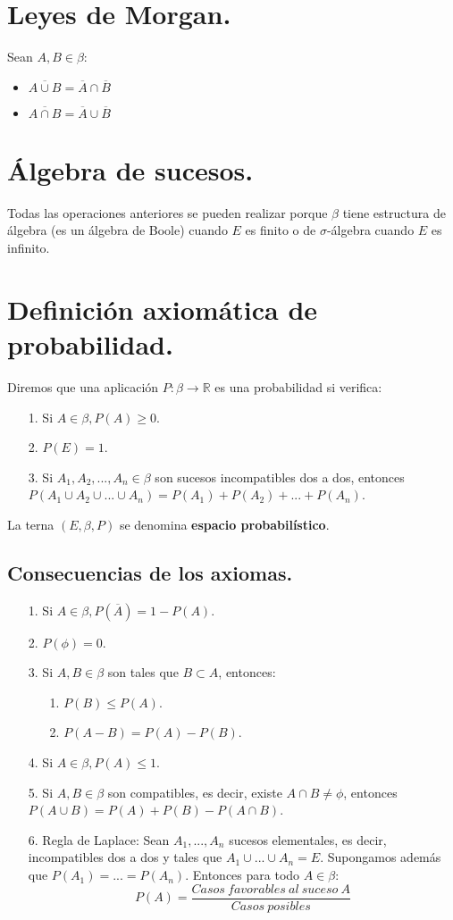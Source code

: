 \section{Leyes de Morgan.}
Sean $A, B \in \beta$:
\begin{itemize}
\item $\overline{A \cup B} = \overline{A} \cap \overline{B}$
\item $\overline{A \cap B} = \overline{A} \cup \overline{B}$
\end{itemize}


\section{Álgebra de sucesos.}
Todas las operaciones anteriores se pueden realizar porque $\beta$ tiene estructura de álgebra (es un álgebra de Boole) cuando $E$ es finito o de $\sigma$-álgebra cuando $E$ es infinito.


\section{Definición axiomática de probabilidad.}
Diremos que una aplicación $P: \beta \rightarrow \mathbb{R}$ es una probabilidad si verifica:
\begin{itemize}
\item[1.]Si $A \in \beta, P(A) \geq 0$.
\item[2.]$P(E) = 1$.
\item[3.]Si $A_{1},A_{2},...,A_{n} \in \beta$ son sucesos incompatibles dos a dos, entonces $P(A_{1} \cup A_{2} \cup ... \cup A_{n}) = P(A_{1}) + P(A_{2}) + ... + P(A_{n})$.
\end{itemize}
La terna $(E,\beta,P)$ se denomina \textbf{espacio probabilístico}.

\subsection{Consecuencias de los axiomas.}
\begin{itemize}
\item[1.]Si $A \in \beta, P(\overline{A}) = 1 - P(A)$.
\item[2.]$P(\phi)=0$.
\item[3.]Si $A,B \in \beta$ son tales que $B \subset A$, entonces:
\begin{itemize}
\item[1.]$P(B) \leq P(A)$.
\item[2.]$P(A-B)=P(A)-P(B)$.
\end{itemize}
\item[4.]Si $A \in \beta, P(A)\leq1$.
\item[5.]Si $A, B \in \beta$ son compatibles, es decir, existe $A \cap B \neq \phi$, entonces $P(A \cup B)=P(A)+P(B)-P(A \cap B)$.
\item[6.]Regla de Laplace: Sean $A_{1},...,A_{n}$ sucesos elementales, es decir, incompatibles dos a dos y tales que $A_{1} \cup ... \cup A_{n} = E$. Supongamos además que $P(A_{1})=...=P(A_{n})$. Entonces para todo $A \in \beta$:
\[P(A)= \frac{Casos\:favorables\:al\:suceso\:A}{Casos\:posibles}\]
\end{itemize}

